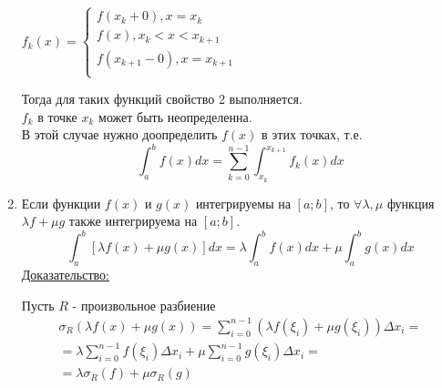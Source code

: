 \documentclass[12pt]{article}
\begin{document}
\begin{enumerate}
\begin{center}
\begin{math}
                f_k(x)=\begin{cases}
                    f(x_k+0),x=x_k\\
                    f(x),x_k<x<x_{k+1}\\
                    f(x_{k+1}-0),x=x_{k+1}\\
                \end{cases}
            \end{math}
        \end{center}
        Тогда для таких функций свойство 2 выполняется.\\
        $f_k$ в точке $x_k$ может быть неопределенна.\\
        В этой случае нужно доопределить $f(x)$ в этих точках, т.е. 
        \[ \int_{a}^{b} f(x) dx=\sum_{k=0}^{n-1}\int_{x_k}^{x_{k+1}}f_k(x)dx\]
        \item Если функции $f(x)$ и $g(x)$ интегрируемы на $[a; b]$, то $\forall \lambda , \mu$ функция $\lambda f+\mu g$ также интегрируема на $[a; b]$.
        \[ \int_{a}^{b}[\lambda f(x) + \mu g(x)]dx=\lambda \int_{a}^{b}f(x)dx + \mu \int_{a}^{b} g(x) dx \]
        \underline{Доказательство:}
        \begin{adjustwidth}{1.5em}{1.5em}
            Пусть $R$ - произвольное разбиение\\
            \begin{gather*}
                \sigma_R(\lambda f(x) + \mu g(x))=\sum_{i=0}^{n-1}(\lambda f(\xi_i) + \mu g(\xi_i))\Delta x_i =\\
                = \lambda \sum_{i=0}^{n-1} f(\xi_i) \Delta x_i +
                \mu \sum_{i=0}^{n-1} g(\xi_i)\Delta x_i =\\
                = \lambda \sigma_R(f)+\mu\sigma_R(g)    
            \end{gather*}
            

\end{adjustwidth}
\end{enumerate}
\end{document}

